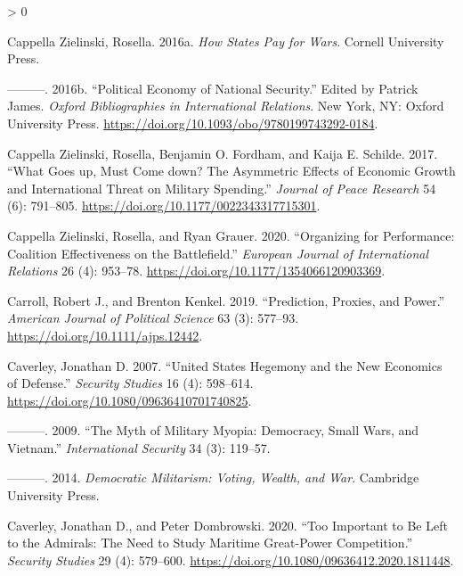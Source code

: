 \documentclass[
]{article}
\newlength{\cslhangindent}
\newenvironment{CSLReferences}[2] %
 {%
  \setlength{\parindent}{0pt}
  \ifodd #1 \everypar{\setlength{\hangindent}{\cslhangindent}}\ignorespaces\fi
  \ifnum #2 > 0
  \setlength{\parskip}{#2\baselineskip}
  \fi
 }%
 {}
\begin{document}
\begin{CSLReferences}{1}{0}
\leavevmode\hypertarget{ref-cappellazielinski_howstatespay_2016}{}%
Cappella Zielinski, Rosella. 2016a. \emph{How {States Pay} for {Wars}}. {Cornell University Press}.

\leavevmode\hypertarget{ref-cappellazielinski_politicaleconomynational_2016}{}%
---------. 2016b. {``Political {Economy} of {National Security}.''} Edited by Patrick James. \emph{Oxford Bibliographies in International Relations}. {New York, NY}: {Oxford University Press}. \url{https://doi.org/10.1093/obo/9780199743292-0184}.

\leavevmode\hypertarget{ref-cappellazielinski_whatgoesmust_2017}{}%
Cappella Zielinski, Rosella, Benjamin O. Fordham, and Kaija E. Schilde. 2017. {``What Goes up, Must Come down? {The} Asymmetric Effects of Economic Growth and International Threat on Military Spending.''} \emph{Journal of Peace Research} 54 (6): 791--805. \url{https://doi.org/10.1177/0022343317715301}.

\leavevmode\hypertarget{ref-cappellazielinski_organizingperformancecoalition_2020}{}%
Cappella Zielinski, Rosella, and Ryan Grauer. 2020. {``Organizing for Performance: Coalition Effectiveness on the Battlefield.''} \emph{European Journal of International Relations} 26 (4): 953--78. \url{https://doi.org/10.1177/1354066120903369}.

\leavevmode\hypertarget{ref-carroll_predictionproxiespower_2019}{}%
Carroll, Robert J., and Brenton Kenkel. 2019. {``Prediction, {Proxies}, and {Power}.''} \emph{American Journal of Political Science} 63 (3): 577--93. \url{https://doi.org/10.1111/ajps.12442}.

\leavevmode\hypertarget{ref-caverley_unitedstateshegemony_2007}{}%
Caverley, Jonathan D. 2007. {``United {States Hegemony} and the {New Economics} of {Defense}.''} \emph{Security Studies} 16 (4): 598--614. \url{https://doi.org/10.1080/09636410701740825}.

\leavevmode\hypertarget{ref-caverley_mythmilitarymyopia_2009}{}%
---------. 2009. {``The {Myth} of {Military Myopia}: {Democracy}, {Small Wars}, and {Vietnam}.''} \emph{International Security} 34 (3): 119--57.

\leavevmode\hypertarget{ref-caverley_democraticmilitarismvoting_2014}{}%
---------. 2014. \emph{Democratic {Militarism}: {Voting}, {Wealth}, and {War}}. {Cambridge University Press}.

\leavevmode\hypertarget{ref-caverley_tooimportantbe_2020}{}%
Caverley, Jonathan D., and Peter Dombrowski. 2020. {``Too {Important} to {Be Left} to the {Admirals}: {The Need} to {Study Maritime Great}-{Power Competition}.''} \emph{Security Studies} 29 (4): 579--600. \url{https://doi.org/10.1080/09636412.2020.1811448}.


\end{CSLReferences}
\end{document}
